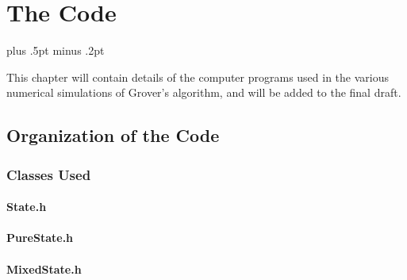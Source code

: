 

\chapter{The Code}
\label{chap:code}

\baselineskip=15.5pt plus .5pt minus .2pt

This chapter will contain details of the computer programs used
in the various numerical simulations of Grover's algorithm, and
will be added to the final draft.

\section{Organization of the Code}

\subsection{Classes Used}

\subsubsection{State.h}


\subsubsection{PureState.h}


\subsubsection{MixedState.h}



